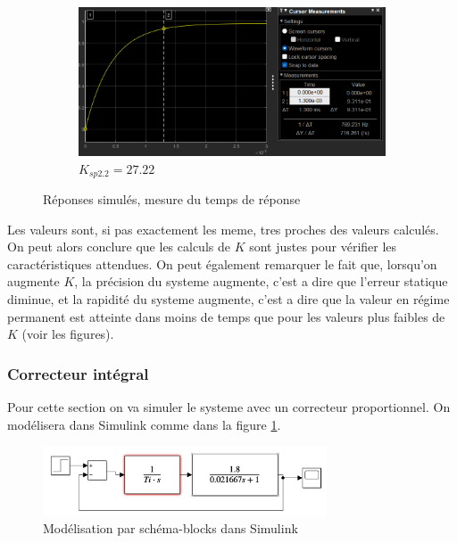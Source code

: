 \documentclass[12pt, a4paper]{report}
\begin{document}
\begin{figure}[h]
\begin{subfigure}[h!]{0.4\linewidth}
    \end{subfigure}
    \hfill
    \begin{subfigure}[h!]{0.4\linewidth}
        \includegraphics[width=\linewidth]{s1simk27tr.png}
        \caption{$K_{sp2.2} = 27.22$}
    \end{subfigure}
    \caption{Réponses simulés, mesure du temps de réponse}
\end{figure}

Les valeurs sont, si pas exactement les meme, tres proches des valeurs calculés. On peut alors
conclure que les calculs de $K$ sont justes pour vérifier les caractéristiques attendues. On peut également remarquer
le fait que, lorsqu'on augmente $K$, la précision du systeme augmente, c'est a dire que l'erreur statique
diminue, et la rapidité du systeme augmente, c'est a dire que la valeur en régime permanent est atteinte dans moins de temps
que pour les valeurs plus faibles de $K$ (voir les figures).

\subsubsection{Correcteur intégral}

Pour cette section on va simuler le systeme avec un correcteur proportionnel. On modélisera dans Simulink
comme dans la figure \ref{fig:schemablocksim2}.

\begin{figure}[h]
    \centering
    \includegraphics[width=0.75\textwidth]{schemasimulink2.png}
    \caption{Modélisation par schéma-blocks dans Simulink}
    \label{fig:schemablocksim2}
\end{figure}
\end{document}
